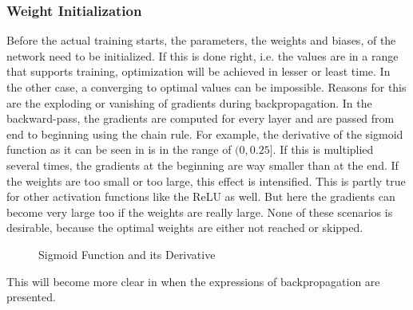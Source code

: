 \subsubsection{Weight Initialization}
\label{sec:training-weight-initialization}
Before the actual training starts, the parameters, the weights and biases, of the network need to be initialized.
If this is done right, i.e. the values are in a range that supports training, optimization will be achieved in lesser or least time.
In the other case, a converging to optimal values can be impossible.
Reasons for this are the exploding or vanishing of gradients during backpropagation\cite{Hochreiter1991}.
In the backward-pass, the gradients are computed for every layer and are passed from end to beginning using the chain rule.
For example, the derivative of the sigmoid function as it can be seen in  is in the range of $(0, 0.25]$.
If this is multiplied several times, the gradients at the beginning are way smaller than at the end.
If the weights are too small or too large, this effect is intensified.
This is partly true for other activation functions like the ReLU as well.
But here the gradients can become very large too if the weights are really large.
None of these scenarios is desirable, because the optimal weights are either not reached or skipped.
\begin{figure}
	\setlength{}
	\setlength{}
	\centering
	
	\caption{Sigmoid Function and its Derivative}
	\label{fig:sigmoid-derivative}
\end{figure}
This will become more clear in  when the expressions of backpropagation are presented.

